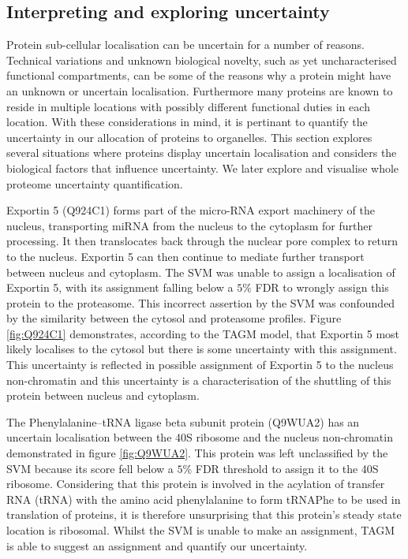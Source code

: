 \documentclass[12pt,english]{article}\usepackage[]{graphicx}\usepackage[]{color}
\begin{document}
\subsection{Interpreting and exploring uncertainty}

Protein sub-cellular localisation can be uncertain for a number of
reasons. Technical variations and unknown biological novelty, such
as yet uncharacterised functional compartments,
can be some of the reasons why a protein might have an unknown
or uncertain localisation. Furthermore many proteins are known to
reside in multiple locations with possibly different functional duties
in each location. With these considerations in mind, it is pertinant
to quantify the uncertainty in our allocation of proteins to organelles.
This section explores several situations where proteins display uncertain
localisation and considers the biological factors that influence uncertainty.
We later explore and visualise whole proteome uncertainty quantification.

\bigskip
Exportin 5 (Q924C1) forms part of the micro-RNA export machinery of the nucleus, transporting miRNA from the nucleus to the cytoplasm for further processing.
It then translocates back through the nuclear pore complex to return to the nucleus.
Exportin 5 can then continue to mediate further transport between nucleus and cytoplasm.
The SVM was unable to assign a localisation of Exportin 5, with its assignment falling below
a $5\%$ FDR to wrongly assign this protein to the proteasome. This incorrect assertion by the SVM
was confounded by the similarity between the cytosol and proteasome profiles.
Figure \ref{fig:Q924C1} demonstrates, according to the TAGM model, that Exportin 5 most
likely localises to the cytosol but there is some uncertainty with this assignment.
This uncertainty is reflected in possible assignment of Exportin 5 to the nucleus non-chromatin
and this uncertainty is a characterisation of the shuttling of this protein between
nucleus and cytoplasm.

The Phenylalanine--tRNA ligase beta subunit protein (Q9WUA2)
has an uncertain localisation between the 40S ribosome and the nucleus non-chromatin
demonstrated in figure \ref{fig:Q9WUA2}. This protein was left
unclassified by the SVM because its score fell below a $5\%$
FDR threshold to assign it to the 40S ribosome. Considering that this protein is involved in
the acylation of transfer RNA (tRNA) with the amino acid phenylalanine to form tRNAPhe
to be used in translation of proteins,
it is therefore unsurprising that this protein's steady state location is ribosomal.
Whilst the SVM is unable to make an assignment, TAGM is able to suggest an assignment
and quantify our uncertainty.
\end{document}
